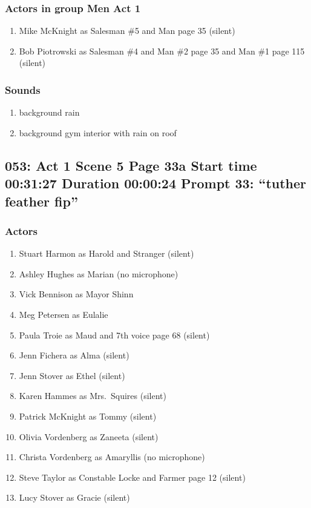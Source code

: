 \subsubsection{Actors in group Men Act 1}
\begin{enumerate}
\item Mike McKnight as Salesman \#5 and Man page 35 (silent)
\item Bob Piotrowski as Salesman \#4 and Man \#2 page 35 and Man \#1 page 115 (silent)
\end{enumerate}

\subsubsection{Sounds}
\begin{enumerate}
\item background rain
\item background gym interior with rain on roof
\end{enumerate}
\subsection{053: Act 1 Scene 5 Page 33a Start time 00:31:27 Duration 00:00:24 Prompt 33: ``tuther feather fip''}

\subsubsection{Actors}
\begin{enumerate}
\item Stuart Harmon as Harold and Stranger (silent)
\item Ashley Hughes as Marian (no microphone)
\item Vick Bennison as Mayor Shinn
\item Meg Petersen as Eulalie
\item Paula Troie as Maud and 7th voice page 68 (silent)
\item Jenn Fichera as Alma (silent)
\item Jenn Stover as Ethel (silent)
\item Karen Hammes as Mrs.~Squires (silent)
\item Patrick McKnight as Tommy (silent)
\item Olivia Vordenberg as Zaneeta (silent)
\item Christa Vordenberg as Amaryllis (no microphone)
\item Steve Taylor as Constable Locke and Farmer page 12 (silent)
\item Lucy Stover as Gracie (silent)
\end{enumerate}
